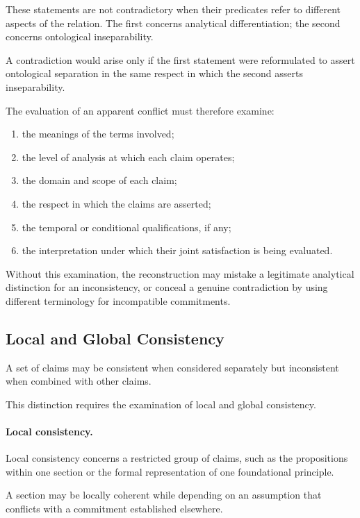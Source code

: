These statements are not contradictory when their predicates
refer to different aspects of the relation. The first concerns
analytical differentiation; the second concerns ontological
inseparability.

A contradiction would arise only if the first statement
were reformulated to assert ontological separation in the
same respect in which the second asserts inseparability.

The evaluation of an apparent conflict must therefore
examine:

\begin{enumerate}
    \item the meanings of the terms involved;
    \item the level of analysis at which each claim operates;
    \item the domain and scope of each claim;
    \item the respect in which the claims are asserted;
    \item the temporal or conditional qualifications, if any;
    \item the interpretation under which their joint
    satisfaction is being evaluated.
\end{enumerate}

Without this examination, the reconstruction may mistake
a legitimate analytical distinction for an inconsistency,
or conceal a genuine contradiction by using different
terminology for incompatible commitments.

\subsection{Local and Global Consistency}

A set of claims may be consistent when considered separately
but inconsistent when combined with other claims.

This distinction requires the examination of local and
global consistency.

\paragraph{Local consistency.}

Local consistency concerns a restricted group of claims,
such as the propositions within one section or the formal
representation of one foundational principle.

A section may be locally coherent while depending on an
assumption that conflicts with a commitment established
elsewhere.

